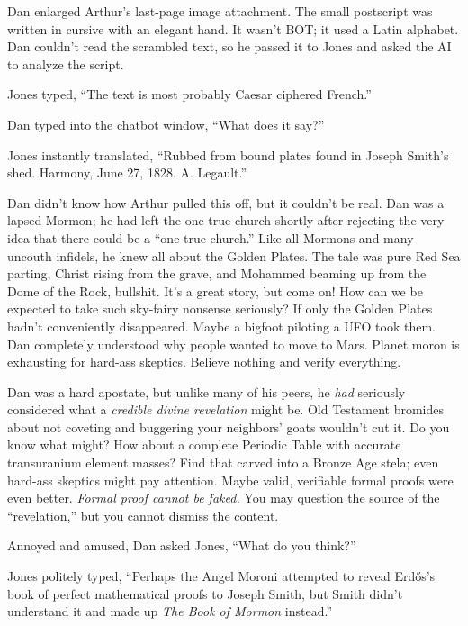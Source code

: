 Dan enlarged Arthur's last-page image attachment. The small postscript
was written in cursive with an elegant hand. It wasn't BOT; it used a
Latin alphabet. Dan couldn't read the scrambled text, so he passed it to
Jones and asked the AI to analyze the script.

Jones typed, ``The text is most probably Caesar ciphered French.''

Dan typed into the chatbot window, ``What does it say?''

Jones instantly translated, ``Rubbed from bound plates found in Joseph
Smith's shed. Harmony, June 27, 1828. A. Legault.''

Dan didn't know how Arthur pulled this off, but it couldn't be real. Dan
was a lapsed Mormon; he had left the one true church shortly after
rejecting the very idea that there could be a ``one true church.'' Like
all Mormons and many uncouth infidels, he knew all about the Golden
Plates. The tale was pure Red Sea parting, Christ rising from the grave,
and Mohammed beaming up from the Dome of the Rock, bullshit. It's a
great story, but come on! How can we be expected to take such sky-fairy
nonsense seriously? If only the Golden Plates hadn't conveniently
disappeared. Maybe a bigfoot piloting a UFO took them. Dan completely
understood why people wanted to move to Mars. Planet moron is exhausting
for hard-ass skeptics. Believe nothing and verify everything.

Dan was a hard apostate, but unlike many of his peers, he \emph{had}
seriously considered what a \emph{credible divine revelation} might be.
Old Testament bromides about not coveting and buggering your neighbors'
goats wouldn't cut it. Do you know what might? How about a complete
Periodic Table with accurate transuranium element masses? Find that
carved into a Bronze Age stela; even hard-ass skeptics might pay
attention. Maybe valid, verifiable formal proofs were even better.
\emph{Formal proof cannot be faked.} You may question the source of the
``revelation,'' but you cannot dismiss the content.

Annoyed and amused, Dan asked Jones, ``What do you think?''

Jones politely typed, ``Perhaps the Angel Moroni attempted to reveal
Erdős's book of perfect mathematical proofs to Joseph Smith, but Smith
didn't understand it and made up \emph{The Book of Mormon} instead.''



%
 

